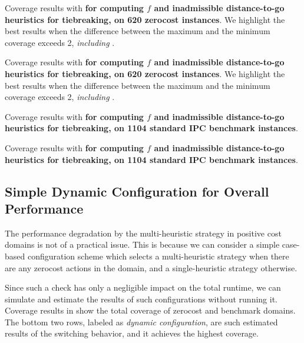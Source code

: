 {
\setlength{\tabcolsep}{0.1em}

\begin{table}[htbp]
 {
 \centering
 
 \caption{
 Coverage results with \textbf{ \lmcut for computing $f$ and inadmissible distance-to-go heuristics for tiebreaking, on 620 zerocost instances}. We highlight the best results when the difference between the maximum and the minimum coverage exceeds 2, \emph{including }.
 }
 \label{tbl:dtg-lmcut-zero}
 }
\end{table}
\begin{table}[htbp]
 {
 \centering
 
 \caption{
 Coverage results with \textbf{ \mands for computing $f$ and inadmissible distance-to-go heuristics for tiebreaking, on 620 zerocost instances}. We highlight the best results when the difference between the maximum and the minimum coverage exceeds 2, \emph{including }.
 }
 \label{tbl:dtg-mands-zero}
 }
\end{table}

\begin{table}[htbp]
 {
 \centering
 
 \caption{
 Coverage results with \textbf{ \lmcut for computing $f$ and inadmissible distance-to-go heuristics for tiebreaking, on 1104 standard IPC benchmark instances}.
 }
 \label{tbl:dtg-lmcut-ipc}
 }
\end{table}
\begin{table}[htbp]
 {
 \centering
 
 \caption{
 Coverage results with \textbf{ \mands for computing $f$ and inadmissible distance-to-go heuristics for tiebreaking, on 1104 standard IPC benchmark instances}.
 }
 \label{tbl:dtg-mands-ipc} }
\end{table}
}

\clearpage
\subsection{Simple Dynamic Configuration for Overall Performance}

The performance degradation by the multi-heuristic strategy in positive cost domains is not of a practical issue.
This is because we can consider a simple case-based configuration scheme which selects a multi-heuristic strategy when there are any zerocost actions in the domain, and a single-heuristic strategy otherwise.

Since such a check has only a negligible impact on the total runtime, we can simulate and estimate the results of such configurations without running it.
Coverage results in  show the total coverage of
zerocost and benchmark domains. The bottom two rows, labeled as \emph{dynamic configuration},
are such estimated results of the switching behavior, and it achieves the highest coverage.


